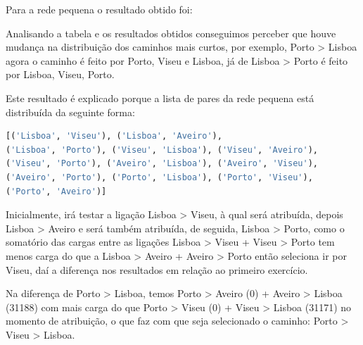 \documentclass[pdftex,12pt,a4paper]{report}
\begin{document}
Para a rede pequena o resultado obtido foi:



Analisando a tabela e os resultados obtidos conseguimos perceber que houve mudança na distribuição dos caminhos mais curtos, por exemplo, Porto > Lisboa agora o caminho é feito por Porto, Viseu e Lisboa, já de Lisboa > Porto é feito por Lisboa, Viseu, Porto.

Este resultado é explicado porque a lista de pares da rede pequena está distribuída da seguinte forma:

\begin{lstlisting}[language=python]
[('Lisboa', 'Viseu'), ('Lisboa', 'Aveiro'),
('Lisboa', 'Porto'), ('Viseu', 'Lisboa'), ('Viseu', 'Aveiro'),
('Viseu', 'Porto'), ('Aveiro', 'Lisboa'), ('Aveiro', 'Viseu'), 
('Aveiro', 'Porto'), ('Porto', 'Lisboa'), ('Porto', 'Viseu'),
('Porto', 'Aveiro')]
\end{lstlisting}

Inicialmente, irá testar a ligação Lisboa > Viseu, à qual será atribuída, depois Lisboa > Aveiro e será também atribuída, de seguida, Lisboa > Porto, como o somatório das cargas entre as ligações Lisboa > Viseu + Viseu > Porto tem menos carga do que a Lisboa > Aveiro + Aveiro > Porto então seleciona ir por Viseu, daí a diferença nos resultados em relação ao primeiro exercício.
 
Na diferença de Porto > Lisboa, temos Porto > Aveiro (0)  + Aveiro > Lisboa (31188) com mais carga do que Porto > Viseu (0) + Viseu > Lisboa (31171) no momento de atribuição, o que faz com que seja selecionado o caminho: Porto > Viseu > Lisboa.





\newpage
\end{document}
